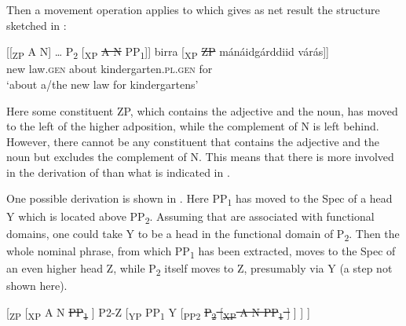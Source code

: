 \documentclass[output=paper]{LSP/langsci}
\begin{document}
\ea%
    \label{ex:julien:11}
   
\z
\z

Then a movement operation applies to  which gives as net result the structure sketched in :

\ea%
    \label{ex:julien:12}
   
  \ea{}     [[\textsubscript{ZP} A N] … P\textsubscript{2} [\textsubscript{XP} \sout{A N} PP\textsubscript{1}]]
\ex \gll\relax  [[\textsubscript{ZP}  ođđa  lága    ]  birra    {[\textsubscript{XP} \sout{ZP}}  mánáidgárddiid      várás]]\\
         {} new  law.\textsc{gen}  {} about       {}   kindergarten.\textsc{pl}.\textsc{gen}   for\\
\glt     ‘about a/the new law for kindergartens’
\z
\z

Here some constituent ZP, which contains the adjective and the noun, has moved to the left of the higher adposition, while the complement of N is left behind. However, there cannot be any constituent that contains the adjective and the noun but excludes the complement of N. This means that there is more involved in the derivation of  than what is indicated in .


One possible derivation is shown in . Here PP\textsubscript{1} has moved to the Spec of a head Y which is located above PP\textsubscript{2}. Assuming that  are associated with functional domains, one could take Y to be a head in the functional domain of P\textsubscript{2}. Then the whole nominal phrase, from which PP\textsubscript{1} has been extracted, moves to the Spec of an even higher head Z, while P\textsubscript{2} itself moves to Z, presumably via Y (a step not shown here).


\ea%
\label{ex:julien:13}
[\textsubscript{ZP}
  [\textsubscript{XP}
    A 
    N 
    \sout{PP\textsubscript{1}}
  ] 
  P2-Z 
  [\textsubscript{YP} 
    PP\textsubscript{1} 
    Y 
    [\textsubscript{PP2} 
      \sout{P\textsubscript{2} 
      [\textsubscript{XP} 
	A 
	N 
	PP\textsubscript{1}
      ]}
    ]
  ]
]
\z 
\end{document}
